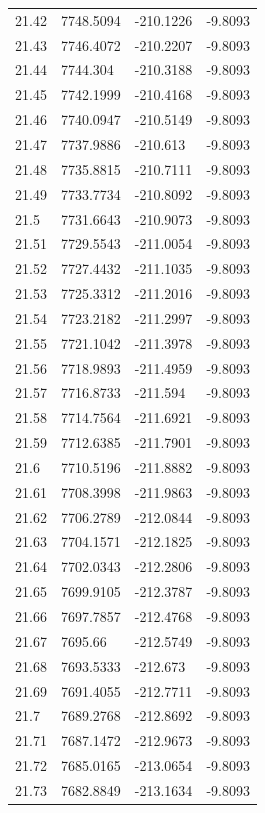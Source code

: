\begin{table}[H]
\begin{tabular}{llll}
21.42 & 7748.5094 & -210.1226 & -9.8093 \\
21.43 & 7746.4072 & -210.2207 & -9.8093 \\
21.44 & 7744.304 & -210.3188 & -9.8093 \\
21.45 & 7742.1999 & -210.4168 & -9.8093 \\
21.46 & 7740.0947 & -210.5149 & -9.8093 \\
21.47 & 7737.9886 & -210.613 & -9.8093 \\
21.48 & 7735.8815 & -210.7111 & -9.8093 \\
21.49 & 7733.7734 & -210.8092 & -9.8093 \\
21.5 & 7731.6643 & -210.9073 & -9.8093 \\
21.51 & 7729.5543 & -211.0054 & -9.8093 \\
21.52 & 7727.4432 & -211.1035 & -9.8093 \\
21.53 & 7725.3312 & -211.2016 & -9.8093 \\
21.54 & 7723.2182 & -211.2997 & -9.8093 \\
21.55 & 7721.1042 & -211.3978 & -9.8093 \\
21.56 & 7718.9893 & -211.4959 & -9.8093 \\
21.57 & 7716.8733 & -211.594 & -9.8093 \\
21.58 & 7714.7564 & -211.6921 & -9.8093 \\
21.59 & 7712.6385 & -211.7901 & -9.8093 \\
21.6 & 7710.5196 & -211.8882 & -9.8093 \\
21.61 & 7708.3998 & -211.9863 & -9.8093 \\
21.62 & 7706.2789 & -212.0844 & -9.8093 \\
21.63 & 7704.1571 & -212.1825 & -9.8093 \\
21.64 & 7702.0343 & -212.2806 & -9.8093 \\
21.65 & 7699.9105 & -212.3787 & -9.8093 \\
21.66 & 7697.7857 & -212.4768 & -9.8093 \\
21.67 & 7695.66 & -212.5749 & -9.8093 \\
21.68 & 7693.5333 & -212.673 & -9.8093 \\
21.69 & 7691.4055 & -212.7711 & -9.8093 \\
21.7 & 7689.2768 & -212.8692 & -9.8093 \\
21.71 & 7687.1472 & -212.9673 & -9.8093 \\
21.72 & 7685.0165 & -213.0654 & -9.8093 \\
21.73 & 7682.8849 & -213.1634 & -9.8093 \\

\end{tabular}
\end{table}
